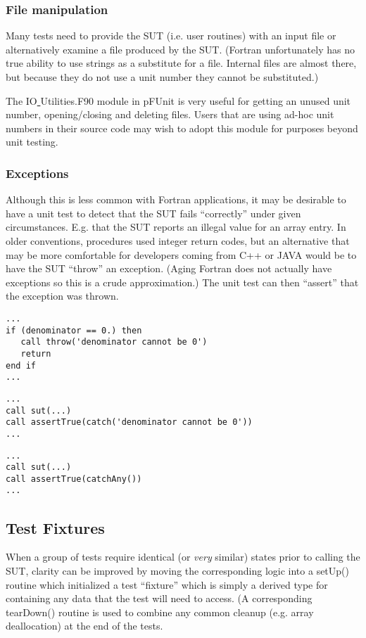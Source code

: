 \documentclass[10pt]{article}
\newcommand{\pfunit}{{\sc pFUnit }}
\begin{document}
\subsubsection{File manipulation}
Many tests need to provide the SUT (i.e. user routines) with an input
file or alternatively examine a file produced by the SUT.  (Fortran
unfortunately has no true ability to use strings as a substitute for a
file.  Internal files are almost there, but because they do not use a
unit number they cannot be substituted.)

The IO\underline{ }Utilities.F90 module in \pfunit is very useful for getting an
unused unit number, opening/closing and deleting files.  Users that
are using ad-hoc unit numbers in their source code may wish to adopt
this module for purposes beyond unit testing.

\subsubsection{Exceptions}
Although this is less common with Fortran applications, it may be
desirable to have a unit test to detect that the SUT fails
``correctly'' under given circumstances.  E.g. that the SUT reports an
illegal value for an array entry.  In older conventions, procedures
used integer return codes, but an alternative that may be more
comfortable for developers coming from C++ or JAVA would be to have
the SUT ``throw'' an exception.  (Aging Fortran does not actually
have exceptions so this is a crude approximation.)  The unit test can
then ``assert'' that the exception was thrown.

\begin{verbatim}
...
if (denominator == 0.) then
   call throw('denominator cannot be 0')
   return
end if
...
\end{verbatim}

\begin{verbatim}
...
call sut(...)
call assertTrue(catch('denominator cannot be 0'))
...
\end{verbatim}

\begin{verbatim}
...
call sut(...)
call assertTrue(catchAny())
...
\end{verbatim}

\subsection{Test Fixtures}
When a group of tests require identical (or \emph{very} similar)
states prior to calling the SUT, clarity can be improved by moving the
corresponding logic into a setUp() routine which initialized a test
``fixture'' which is simply a derived type for containing any data
that the test will need to access.  (A corresponding tearDown()
routine is used to combine any common cleanup (e.g. array
deallocation) at the end of the tests.
\end{document}
